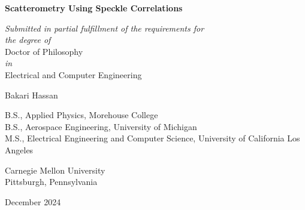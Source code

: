 \thispagestyle{empty}



{
\centering
\Large

\vspace*{\fill} %

{\huge \textbf{Scatterometry Using Speckle Correlations}} %



\vspace{1.0cm}

\textit{Submitted in partial fulfillment of the requirements for\\
the degree of} \\[1em]
{\Large Doctor of Philosophy}\\ %
\textit{in} \\
{\Large Electrical and Computer Engineering} %

\vspace{1.5cm}

{ \LARGE
	Bakari Hassan\\ %
}

\vspace{1.0cm}


B.S., Applied Physics, Morehouse College\\
B.S., Aerospace Engineering, University of Michigan \\
M.S., Electrical Engineering and Computer Science, University of California Los Angeles

\vspace{3.0cm}

Carnegie Mellon University\\ %
Pittsburgh, Pennsylvania\\ %


December 2024 %

}
	


